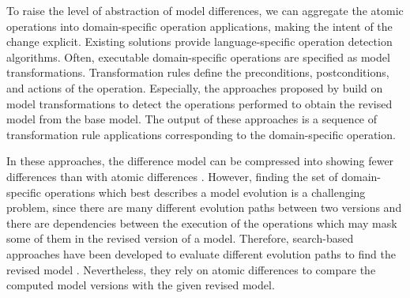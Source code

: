To raise the level of abstraction of model differences, we can aggregate the atomic operations into domain-specific operation applications, making the intent of the change explicit.
Existing solutions  provide language-specific operation detection algorithms.
Often, executable domain-specific operations are specified as model transformations.
Transformation rules define the preconditions, postconditions, and actions of the operation.
Especially, the approaches  proposed by  build on model transformations to detect the operations performed to obtain the revised model from the base model.
The output of these approaches is a sequence of transformation rule applications corresponding to the domain-specific operation.

In these approaches, the difference model can be compressed into showing fewer differences than with atomic differences .
However, finding the set of domain-specific operations which best describes a model evolution is a challenging problem, since there are many different evolution paths between two versions and there are dependencies between the execution of the operations which may mask some of them in the revised version of a model.
Therefore, search-based approaches have been developed to evaluate different evolution paths to find the revised model .
Nevertheless, they rely on atomic differences to compare the computed model versions with the given revised model.

%

